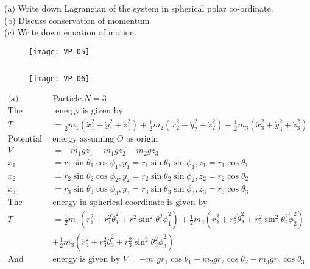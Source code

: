 \begin{enumerate}
		(a) Write down Lagrangian of the system in spherical polar co-ordinate.\\
		(b) Discuss conservation of momentum\\
		(c) Write down equation of motion.\\
		\begin{figure}[H]
			\centering
			\texttt{[image: VP-05]}
		\end{figure}
	\begin{answer}$\left. \right. $\\
		\begin{figure}[H]
			\centering
			\texttt{[image: VP-06]}
		\end{figure}
		\begin{align*}
		\text{(a) Number of }&\text{Particle,} N=3\\
		\text{The kinetic}&\text{ energy  is given by}\\
		T&=\frac{1}{2} m_{1}\left(\dot{x}_{1}^{2}+\dot{y}_{1}^{2}+\dot{z}_{1}^{2}\right)+\frac{1}{2} m_{2}\left(\dot{x}_{2}^{2}+\dot{y}_{2}^{2}+\dot{z}_{2}^{2}\right)+\frac{1}{2} m_{3}\left(\dot{x}_{3}^{2}+\dot{y}_{3}^{2}+\dot{z}_{3}^{2}\right)\\
		\text{Potential  }&\text{energy assuming $O$ as origin}\\
		V&=-m_{1} g z_{1}-m_{1} g z_{2}-m_{2} g z_{3}\\
		x_{1}&=r_{1} \sin \theta_{1} \cos \phi_{1}, y_{1}=r_{1} \sin \theta_{1} \sin \phi_{1}, z_{1}=r_{1} \cos \theta_{1}\\
		x_{2}&=r_{2} \sin \theta_{2} \cos \phi_{2}, y_{2}=r_{2} \sin \theta_{2} \sin \phi_{2}, z_{2}=r_{2} \cos \theta_{2}\\
		x_{3}&=r_{3} \sin \theta_{3} \cos \phi_{3}, y_{3}=r_{3} \sin \theta_{3} \sin \phi_{3}, z_{3}=r_{3} \cos \theta_{3}\\
		\text{The kinetic  }&\text{energy in spherical coordinate is given by}\\
		T&=\frac{1}{2} m_{1}\left(\dot{r}_{1}^{2}+r_{1}^{2} \dot{\theta}_{1}^{2}+r_{1}^{2} \sin ^{2} \theta_{1}^{2} \dot{\phi}_{1}^{2}\right)+\frac{1}{2} m_{2}\left(\dot{r}_{2}^{2}+r_{2}^{2} \dot{\theta}_{2}^{2}+r_{2}^{2} \sin ^{2} \theta_{2}^{2} \dot{\phi}_{2}^{2}\right)\\
		&+\frac{1}{2} m_{3}\left(\dot{r}_{3}^{2}+r_{3}^{2} \dot{\theta}_{3}^{2}+r_{3}^{2} \sin ^{2} \theta_{3}^{2} \dot{\phi}_{3}^{2}\right)\\
		\text{And potential }&\text{energy is given by }V=-m_{1} g r_{1} \cos \theta_{1}-m_{2} g r_{2} \cos \theta_{2}-m_{3} g r_{3} \cos \theta_{3}\\

\end{align*}
\end{answer}
\end{enumerate}
